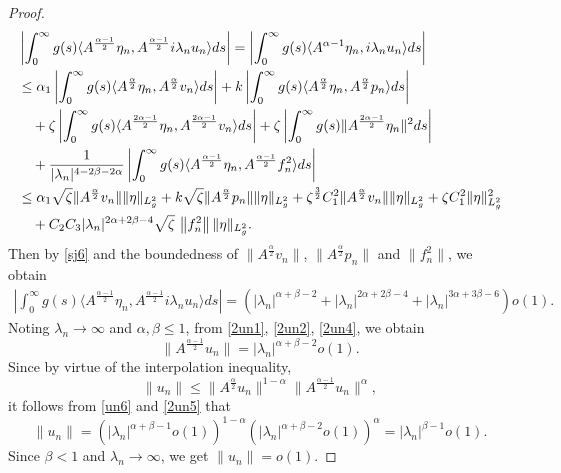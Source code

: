 \documentclass[12pt,reqno]{article}
\begin{document}
\begin{proof}
\begin{align*}
			&\left| \int_0^\infty g(s) \langle
			A^{\frac{\alpha-1}{2}} \eta_n, A^{\frac{\alpha-1}{2}}
			i\lambda_n u_n \rangle ds \right|
			= \left| \int_0^\infty g(s) \langle A^{\alpha-1} \eta_n,
			i\lambda_n u_n \rangle ds \right| \nonumber \\
			&\leq \alpha_1 \left| \int_0^\infty g(s) \langle
			A^{\frac{\alpha}{2}} \eta_n, A^{\frac{\alpha}{2}} v_n
			\rangle ds \right|
			+ k \left| \int_0^\infty g(s) \langle
			A^{\frac{\alpha}{2}} \eta_n, A^{\frac{\alpha}{2}} p_n
			\rangle ds \right|  \\
			&\quad + \zeta \left| \int_0^\infty g(s) \langle
			A^{\frac{2\alpha-1}{2}} \eta_n, A^{\frac{2\alpha-1}{2}} v_n
			\rangle ds \right|
			+ \zeta \left| \int_0^\infty g(s) \|
			A^{\frac{2\alpha-1}{2}} \eta_n \|^2 ds \right|  \\
			&\quad + \frac{1}{|\lambda_n|^{4-2\beta-2\alpha}} \left|
			\int_0^\infty g(s) \langle A^{\frac{\alpha-1}{2}}
			\eta_n, A^{\frac{\alpha-1}{2}} f_n^2 \rangle ds \right|\\
&  \leq \alpha_1 \sqrt{\zeta}\| A^{\frac{\alpha}{2}} v_n \|  \|\eta\|_{L^2_g}
			+ k \sqrt{\zeta}\| A^{\frac{\alpha}{2}} p_n \| \|\eta\|_{L^2_g} + \zeta^{\frac{3}{2}} C_1^2 \| A^{\frac{\alpha}{2}} v_n \| \|\eta\|_{L^2_g}
			+ \zeta C_1^2\|\eta\|_{L^2_g}^2\notag \\
			& \quad + C_2C_3 |\lambda_n|^{2\alpha +2\beta -4} \sqrt{\zeta} \, \left\| f_n^2 \right\|\|\eta\|_{L^2_g}.
		\end{align*}
	Then by \eqref{sj6} and the boundedness of $\| A^{\frac{\alpha}{2}} v_n \|$, $\| A^{\frac{\alpha}{2}} p_n \|$ and $\|f_n^2\|$, we obtain
		\begin{align}\label{2un4}
	\left| \int_0^\infty g(s) \langle A^{\frac{\alpha-1}{2}} \eta_n, A^{\frac{\alpha-1}{2}} i\lambda_n u_n \rangle ds \right|=\left(|\lambda_n|^{\alpha +\beta -2}+|\lambda_n|^{2\alpha +2\beta -4}+|\lambda_n|^{3\alpha +3\beta -6}\right)o(1).
		\end{align}
Noting $\lambda_n\to\infty$ and $\alpha,\beta\le1$, 	from \eqref{2un1}, \eqref{2un2}, \eqref{2un4}, we obtain
		\begin{equation}\label{2un5}
			\|A^{\frac{\alpha-1}{2}}u_n\|=|\lambda_n|^{\alpha +\beta -2}o(1).
		\end{equation}
Since by virtue of the interpolation inequality,
\[\|u_n\| \le\|A^{\frac{\alpha}{2}}u_n\|^{1-\alpha}\|A^{\frac{\alpha-1}{2}}u_n\|^{\alpha},\]
it follows from \eqref{un6} and \eqref{2un5} that
\[\|u_n\|=\left(|\lambda_n|^{\alpha + \beta - 1} o(1)\right)^{1-\alpha}\left(|\lambda_n|^{\alpha +\beta -2}o(1)\right)^{\alpha}=|\lambda_n|^{\beta-1}o(1).\]
Since $\beta<1$ and $\lambda_n\to\infty$, we get $	\| u_n \|=o(1)$.


\end{proof}
\end{document}

